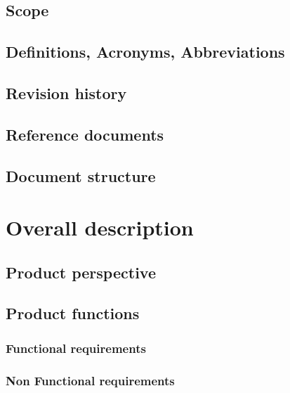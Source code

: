 \documentclass[a4paper,oneside,11pt]{article}
\begin{document}
        \subsection{Scope}
            
        \subsection{Definitions, Acronyms, Abbreviations}
            
                \newpage
        \subsection{Revision history}
         
             \newpage


        \subsection{Reference documents}
            
        \subsection{Document structure}
        
        
    \newpage
    \section{Overall description}
        \subsection{Product perspective}
            
        \subsection{Product functions}
            
            \subsubsection{Functional requirements}
            
            \subsubsection{Non Functional requirements}
            
\end{document}
